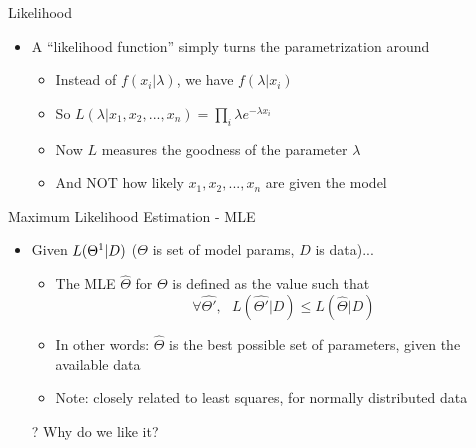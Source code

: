 \documentclass[aspectratio=169]{beamer}
\begin{document}
\begin{frame}{Likelihood}

\begin{itemize}
\item A ``likelihood function'' simply turns the parametrization around
\begin{itemize}
\item Instead of  $f (x_i | \lambda)$, we have  $f (\lambda | x_i )$
\item So $L (\lambda | x_1, x_2, ..., x_n) = \prod_i \lambda e^{-\lambda x_i}$
\item Now $L$ measures the goodness of the parameter $\lambda$
\item And NOT how likely $x_1, x_2, ..., x_n$ are given the model
\end{itemize}
\end{itemize}
\end{frame}
\begin{frame}{Maximum Likelihood Estimation - MLE}

\begin{itemize}
\item Given $L(\Theta \footnote{$\Theta$ is commonly used to denote a set of parameters} | D)$ ($\Theta$ is set of model params, $D$ is data)...
	\begin{itemize}
	\item The MLE $\hat{\Theta}$ for $\Theta$ is defined as the value such that
		$$\forall \hat{\Theta'}, \textrm{ } L(\hat{\Theta'} | D) \leq L(\hat{\Theta} | D)$$
	\item In other words: $\hat{\Theta}$ is the best possible set of parameters, given the available data
	\item Note: closely related to least squares, for normally distributed data
	\end{itemize}
\item[?] Why do we like it?
\end{itemize}
\end{frame}
\end{document}
